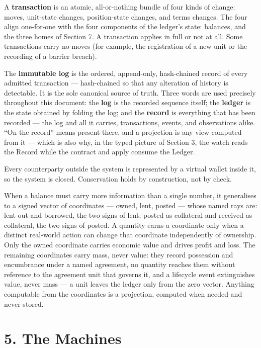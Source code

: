 \documentclass[11pt,a4paper]{article}
\begin{document}
A \textbf{transaction} is an atomic, all-or-nothing bundle of four kinds
of change: moves, unit-state changes, position-state changes, and terms
changes. The four align one-for-one with the four components of the
ledger's state: balances, and the three homes of Section 7. A
transaction applies in full or not at all. Some transactions carry no
moves (for example, the registration of a new unit or the recording of a
barrier breach).

The \textbf{immutable log} is the ordered, append-only, hash-chained
record of every admitted transaction --- hash-chained so that any
alteration of history is detectable. It is the sole canonical source of
truth. Three words are used precisely throughout this document: the
\textbf{log} is the recorded sequence itself; the \textbf{ledger} is the
state obtained by folding the log; and the \textbf{record} is everything
that has been recorded --- the log and all it carries, transactions,
events, and observations alike. ``On the record'' means present there,
and a projection is any view computed from it --- which is also why, in
the typed picture of Section 3, the watch reads the Record while the
contract and apply consume the Ledger.

Every counterparty outside the system is represented by a virtual wallet
inside it, so the system is closed. Conservation holds by construction,
not by check.

When a balance must carry more information than a single number, it
generalises to a signed vector of coordinates --- owned, lent, posted ---
whose named rays are: lent out and borrowed, the two signs of lent;
posted as collateral and received as collateral, the two signs of
posted. A quantity earns a
coordinate only when a distinct real-world action can change that
coordinate independently of ownership. Only the owned coordinate carries
economic value and drives profit and loss. The remaining coordinates
carry mass, never value: they record possession and encumbrance under a
named agreement, no quantity reaches them without reference to the
agreement unit that governs it, and a lifecycle event extinguishes
value, never mass --- a unit leaves the ledger only from the zero
vector. Anything computable from the
coordinates is a projection, computed when needed and never stored.

\hypertarget{the-machines}{%
\section{5. The Machines}\label{the-machines}}
\end{document}
